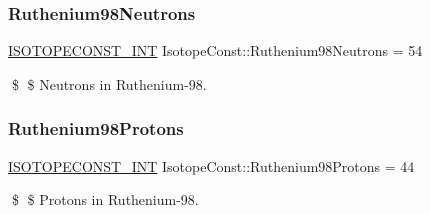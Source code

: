 \subsubsection{\texorpdfstring{Ruthenium98\+Neutrons}{Ruthenium98Neutrons}}
{\footnotesize\ttfamily \mbox{\hyperlink{group___isotope_const-_macros_ga5f18360b3e99483a35c32d789e62621c}{I\+S\+O\+T\+O\+P\+E\+C\+O\+N\+S\+T\+\_\+\+I\+NT}} Isotope\+Const\+::\+Ruthenium98\+Neutrons = 54}

\$ \$ Neutrons in Ruthenium-\/98. \mbox{\label{group___isotope_const-_ruthenium-_ru98_gaf1305798d92239d2cce208e06a2e37c1}} 
\subsubsection{\texorpdfstring{Ruthenium98\+Protons}{Ruthenium98Protons}}
{\footnotesize\ttfamily \mbox{\hyperlink{group___isotope_const-_macros_ga5f18360b3e99483a35c32d789e62621c}{I\+S\+O\+T\+O\+P\+E\+C\+O\+N\+S\+T\+\_\+\+I\+NT}} Isotope\+Const\+::\+Ruthenium98\+Protons = 44}

\$ \$ Protons in Ruthenium-\/98. 